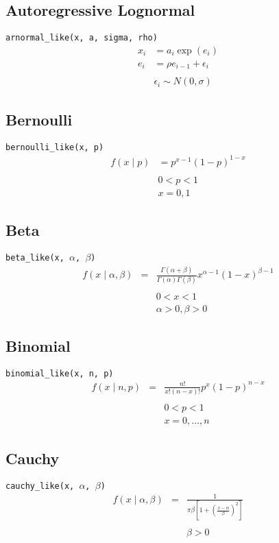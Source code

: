 \subsection*{Autoregressive Lognormal}
\verb=arnormal_like(x, a, sigma, rho)=
\begin{eqnarray*}
	x_i & = a_i \exp(e_i) \\
   e_i & = \rho e_{i-1} + \epsilon_i \\
 \\
 & \epsilon_i \sim N(0,\sigma)
\end{eqnarray*}

\subsection*{Bernoulli}
\verb=bernoulli_like(x, p)=
\begin{eqnarray*}
f(x \mid p) &= p^{x- 1} (1-p)^{1-x} \\
\\
&0 < p < 1 \\
&x=0,1
\end{eqnarray*}

\subsection*{Beta}
\verb=beta_like(x, =$\alpha$\verb=, =$\beta$\verb=)=
\begin{eqnarray*}
f(x \mid \alpha, \beta) &=& \frac{\Gamma(\alpha + \beta)}{\Gamma(\alpha) \Gamma(\beta)} x^{\alpha - 1} (1 - x)^{\beta - 1} \\
\\
&&0 < x < 1 \\
&&\alpha > 0, \beta > 0
\end{eqnarray*}

\subsection*{Binomial}
\verb=binomial_like(x, n, p)=
\begin{eqnarray*}
f(x \mid n, p) &=& \frac{n!}{x!(n-x)!}p^x (1-p)^{n-x} \\
\\
&&0 < p < 1 \\
&&x = 0,\ldots,n
\end{eqnarray*}

\subsection*{Cauchy}
\verb=cauchy_like(x, =$\alpha$\verb=, =$\beta$\verb=)=
\begin{eqnarray*}
f(x \mid \alpha, \beta) &=& \frac{1}{\pi \beta [1 + (\frac{x-\alpha}{\beta})^2]} \\
\\
&& \beta > 0
\end{eqnarray*}

